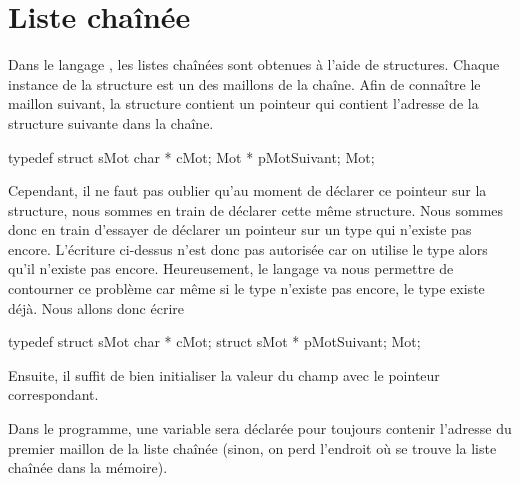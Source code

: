 \documentclass[a4paper]{article}
\begin{document}
	\section{Liste chaînée}
		Dans le langage , les listes chaînées sont obtenues à l'aide de structures.
		Chaque instance de la structure est un des maillons de la chaîne.
		Afin de connaître le maillon suivant, la structure contient un pointeur qui contient l'adresse de la structure suivante dans la chaîne.
		\begin{Code*}
typedef struct sMot
{
	char * cMot;
	Mot * pMotSuivant;
} Mot;
		\end{Code*}
		Cependant, il ne faut pas oublier qu'au moment de déclarer ce pointeur sur la structure, nous sommes en train de déclarer cette même structure.
		Nous sommes donc en train d'essayer de déclarer un pointeur sur un type qui n'existe pas encore.
		L'écriture ci-dessus n'est donc pas autorisée car on utilise le type  alors qu'il n'existe pas encore.
		Heureusement, le langage  va nous permettre de contourner ce problème car même si le type  n'existe pas encore, le type  existe déjà.
		Nous allons donc écrire
		\begin{Code*}
typedef struct sMot
{
	char * cMot;
	struct sMot * pMotSuivant;
} Mot;
		\end{Code*}
		Ensuite, il suffit de bien initialiser la valeur du champ  avec le pointeur correspondant.

		Dans le programme, une variable sera déclarée pour toujours contenir l'adresse du premier maillon de la liste chaînée (sinon, on perd l'endroit où se trouve la liste chaînée dans la mémoire).
\end{document}
